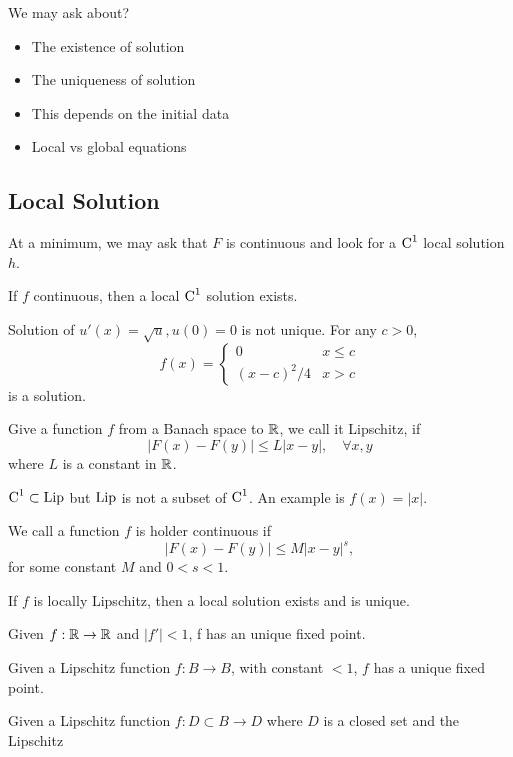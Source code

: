 We may ask about? 
\begin{itemize}
    \item The existence of solution
    \item The uniqueness of solution 
    \item This depends on the initial data
    \item Local vs global equations
\end{itemize}

\subsection{Local Solution}
At a minimum, we may ask that $F$ is continuous and look for a $\operatorname{C}^1$ local solution $h$.

\begin{theorem}
    [Peano] If $f$ continuous, then a local $\operatorname{C}^1$ solution exists.
\end{theorem}

\begin{example}
    Solution of $u'(x) = \sqrt{u}, u(0)=0$ is not unique. For any $c>0$,
    \[
    f(x) = 
    \begin{cases}
        0 & x\le c\\
        (x-c)^2/4 &x>c
    \end{cases}    
    \]
    is a solution.
\end{example}

\begin{definition}
     Give a function $f$ from a Banach space to $\mathbb{R}$, we call it Lipschitz, if 
    \[
        |F(x) - F(y)| \le L |x-y|, \quad \forall x,y    
    \]
    where $L$ is a constant in $\mathbb{R}$.
\end{definition}
\begin{remark}
    $\operatorname{C}^1 \subset \operatorname{Lip} $ but $\operatorname{Lip}$ is not a subset of $\operatorname{C}^1$. An example is $f(x) = |x|$.
\end{remark}

\begin{definition}
    We call a function $f$ is holder continuous if
    \[
        |F(x) - F(y)| \le M |x-y|^s,    
    \] 
    for some constant $M$ and $0<s<1$.
\end{definition}

\begin{theorem}
    If $f$ is locally Lipschitz, then a local solution exists and is unique.
\end{theorem}

\begin{theorem}
    Given $f:\mathbb{R} \to \mathbb{R}$ and $|f'| <1$, f has an unique fixed point. 
\end{theorem}

\begin{theorem}
    Given a Lipschitz function $f: B \to B$, with constant $<1$, $f$ has a unique fixed point. 
\end{theorem}

\begin{theorem}
    Given a Lipschitz function $f:D\subset B\to D$ where $D$ is a closed set and the Lipschitz
\end{theorem}